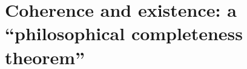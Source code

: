 \providecommand{\BV}{\mathrm{BV}}
\providecommand{\RobQ}{\mathsf{Q}}
\providecommand{\Pt}{\mathrm{Pt}}
\providecommand{\Fix}{\mathrm{Fix}}
\providecommand{\Sent}{\mathrm{Sent}}
\providecommand{\Der}{\mathrm{Der}}
\providecommand{\MC}{\mathrm{MC}}
\providecommand{\LMS}{\mathrm{LMS}}
\providecommand{\conv}{\mathrm{conv}}
\providecommand{\Prf}{\mathrm{Prf}}
\providecommand{\nml}[1]{\underline{#1}}
\providecommand{\twoM}{\mathbf{2}}
\providecommand{\HthreeA}{\mathbf{H}_3}
\providecommand{\hstar}{h^{*}}

\section{Coherence and existence: a ``philosophical completeness theorem''}\label{sec:existence}

